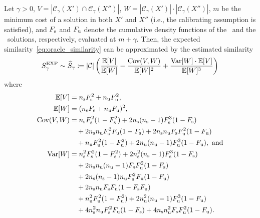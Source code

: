 \begin{theorem}
\label{thm:oracle_similarity}
Let $\gamma>0$, $V = |\mathcal{C}_\gamma(X')\cap \mathcal{C}_\gamma(X'')|$,
$W = |\mathcal{C}_\gamma(X')|\cdot |\mathcal{C}_\gamma(X'')|$, $m$ be the minimum cost of a
solution in both $X'$ and $X''$ (i.e., the calibrating assumption is
satisfied), and $F_\text{s}$ and $F_\text{u}$ denote the cumulative density functions of the
\good\ and the \bad\ solutions, respectively, evaluated at $m+\gamma$. Then, the
expected similarity~\eqref{eq:oracle_similarity} can be approximated by the
estimated similarity
\begin{align}
  \label{eq:esim}
  S_\gamma^{\mathrm{EXP}} \sim \widehat S_\gamma \coloneqq |\mathcal{C}|\left(
    \frac{\mathbb{E}[V]}{\mathbb{E}[W]} -
    \frac{{\mathrm{Cov}}(V,W)}{\mathbb{E}[W]^2} + \frac{{\mathrm{Var}}[W] \cdot \mathbb{E}[V]}{\mathbb{E}[W]^3}\right)
\end{align}
%
where
\begin{align}
  \label{eq:esim:ev}
  \mathbb{E}[V] &= n_\text{s}F_\text{s}^2 + n_\text{u}F_\text{u}^2, \\
  \label{eq:esim:ew}
  \mathbb{E}[W] &= (n_\text{s}F_\text{s} + n_\text{u}F_\text{u})^2, \\
  \label{eq:esim:cov}
  {\mathrm{Cov}}(V, W) &= n_\text{s}F_\text{s}^2(1 - F_\text{s}^2) + 2n_\text{s}(n_\text{s}-1) F_\text{s}^3(1 - F_\text{s}) \notag \\
    &\quad + 2n_\text{s}n_\text{u}F_\text{s}^2F_\text{u} (1 - F_\text{s}) + 2n_\text{s}n_\text{u}F_\text{s}F_\text{u}^2(1 - F_\text{u}) \notag \\
    &\quad + n_\text{u}F_\text{u}^2(1 - F_\text{u}^2) + 2n_\text{u}(n_\text{u}-1) F_\text{u}^3(1 - F_\text{u}), \text{ and} \\
  \label{eq:esim:var}
  {\mathrm{Var}}[W] &= n_\text{s}^2F_\text{s}^2(1- F_\text{s}^2) + 2n_\text{s}^2(n_\text{s}-1)F_\text{s}^3(1 - F_\text{s}) \notag\\
    &\quad + 2n_\text{s}n_\text{u}(n_\text{u} - 1) F_\text{s} F_\text{u}^2 (1 - F_\text{s}) \notag\\
    &\quad + 2n_\text{s}(n_\text{s} - 1)n_\text{u} F_\text{s}^2 F_\text{u} (1 - F_\text{u}) \notag\\
    &\quad + 2n_\text{s}n_\text{u} F_\text{s} F_\text{u} (1 - F_\text{s}F_\text{u}) \notag\\
    &\quad + n_\text{u}^2 F_\text{u}^2 (1 - F_\text{u}^2) + 2n_\text{u}^2(n_\text{u}-1) F_\text{u}^3 (1 - F_\text{u}) \notag\\
    &\quad + 4 n_\text{s}^2 n_\text{u} F_\text{s}^2 F_\text{u} (1 - F_\text{s}) + 4n_\text{s}n_\text{u}^2 F_\text{s} F_\text{u}^2 (1 - F_\text{u}).
\end{align}
\end{theorem}

